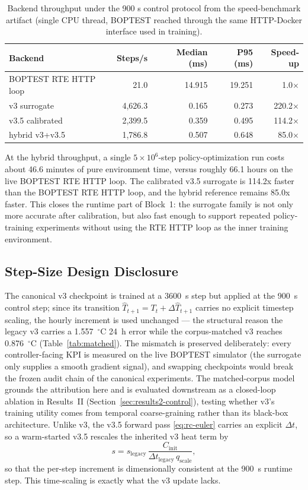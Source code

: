 \documentclass[11pt,a4paper]{article}
\newcommand{\That}{\ensuremath{\widehat{T}}}
\begin{document}
\begin{table}[H]
\centering
\small
\caption{Backend throughput under the 900 s control protocol from the speed-benchmark artifact (single CPU thread, BOPTEST reached through the same HTTP-Docker interface used in training).}
\label{tab:speed}
\begin{tabular}{lrrrr}
\toprule
Backend & Steps/s & Median (ms) & P95 (ms) & Speed-up \\
\midrule
BOPTEST RTE HTTP loop & 21.0 & 14.915 & 19.251 & 1.0$\times$ \\
v3 surrogate & 4,626.3 & 0.165 & 0.273 & 220.2$\times$ \\
v3.5 calibrated & 2,399.5 & 0.359 & 0.495 & 114.2$\times$ \\
hybrid v3+v3.5 & 1,786.8 & 0.507 & 0.648 & 85.0$\times$ \\
\bottomrule
\end{tabular}
\end{table}

At the hybrid throughput, a single \(5\times10^6\)-step policy-optimization run costs about 46.6 minutes of pure environment time, versus roughly 66.1 hours on the live BOPTEST RTE HTTP loop. The calibrated v3.5 surrogate is 114.2x faster than the BOPTEST RTE HTTP loop, and the hybrid reference remains 85.0x faster. This closes the runtime part of Block~1: the surrogate family is not only more accurate after calibration, but also fast enough to support repeated policy-training experiments without using the RTE HTTP loop as the inner training environment.

\subsection{Step-Size Design Disclosure}
\label{ssec:block1-stepsize}

The canonical v3 checkpoint is trained at a 3600~s step but applied at the 900~s control step; since its transition \(\That_{t+1}=T_t+\Delta\That_{t+1}\) carries no explicit timestep scaling, the hourly increment is used unchanged --- the structural reason the legacy v3 carries a 1.557~$^\circ$C 24~h error while the corpus-matched v3 reaches 0.876~$^\circ$C (Table~\ref{tab:matched}). The mismatch is preserved deliberately: every controller-facing KPI is measured on the live BOPTEST simulator (the surrogate only supplies a smooth gradient signal), and swapping checkpoints would break the frozen audit chain of the canonical experiments. The matched-corpus model grounds the attribution here and is evaluated downstream as a closed-loop ablation in Results~II (Section~\ref{sec:results2-control}), testing whether v3's training utility comes from temporal coarse-graining rather than its black-box architecture. Unlike v3, the v3.5 forward pass \eqref{eq:rc-euler} carries an explicit \(\Delta t\), so a warm-started v3.5 rescales the inherited v3 heat term by
\begin{equation}
  s = s_{\mathrm{legacy}}\,\frac{C_{\mathrm{init}}}{\Delta t_{\mathrm{legacy}}\,q_{\mathrm{scale}}},
  \label{eq:warmstart-scale}
\end{equation}
so that the per-step increment is dimensionally consistent at the 900~s runtime step. This time-scaling is exactly what the v3 update lacks.
\end{document}
